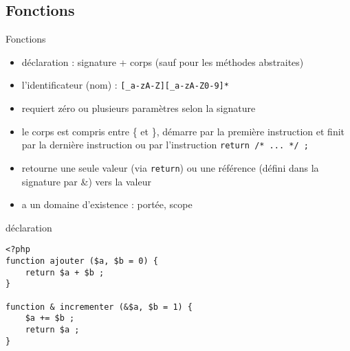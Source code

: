 \subsection{Fonctions}

\begin{frame}[containsverbatim]{Fonctions} %
	\begin{itemize}
		\item déclaration : signature + corps (sauf pour les méthodes abstraites)
		\item l'identificateur (nom) : \texttt{[\_a-zA-Z][\_a-zA-Z0-9]*}
		\item requiert zéro ou plusieurs paramètres selon la signature
		\item le corps est compris entre \{ et \}, démarre par la première instruction et finit par la dernière instruction ou par l'instruction \lstinline!return /* ... */ ;!
		\item retourne une seule valeur (via \texttt{return}) ou une référence (défini dans la signature par \&) vers la valeur
		\item a un domaine d'existence : portée, scope
	\end{itemize}
	\begin{block}{déclaration}
		\begin{lstlisting}
<?php
function ajouter ($a, $b = 0) {
	return $a + $b ;
}

function & incrementer (&$a, $b = 1) {
	$a += $b ;
	return $a ;
}
		\end{lstlisting}
	\end{block} 
\end{frame}

